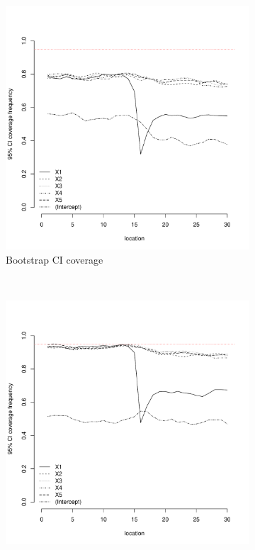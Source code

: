 \documentclass[authoryear, review, 11pt]{elsarticle}
\begin{document}
\begin{figure}
	\vspace{-30mm}
	\centering
	\begin{subfigure}[b]{0.45\textwidth}
	\centering
		\includegraphics[width=\textwidth]{../../figures/simulation/15.15.profile_bootstrap_coverage.pdf}
		\caption{Bootstrap CI coverage}
	\end{subfigure}%
	~ %
	\begin{subfigure}[b]{0.45\textwidth}
	\centering
		\includegraphics[width=\textwidth]{../../figures/simulation/15.15.profile_se_coverage.pdf}

\end{subfigure}
\end{figure}
\end{document}
